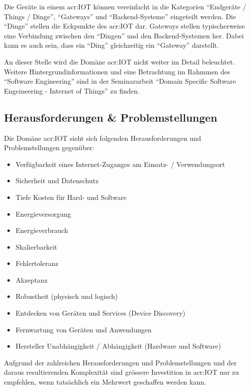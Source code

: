 Die Geräte in einem \gls{acr:IOT} können vereinfacht in die Kategorien "`Endgeräte / Things / Dinge"', "`Gateways"' und "`Backend-Systeme"' eingeteilt werden. Die "`Dinge"' stellen die Eckpunkte des \gls{acr:IOT} dar. Gateways stellen typischerweise eine Verbindung zwischen den "`Dingen"' und den Backend-Systemen her. Dabei kann es auch sein, dass ein "`Ding"' gleichzeitig  ein "`Gateway"' darstellt.

An dieser Stelle wird die Domäne \gls{acr:IOT} nicht weiter im Detail beleuchtet. Weitere Hintergrundinformationen und eine Betrachtung im Rahmmen des "`Software Engineering"' sind in der Seminararbeit "`Domain Specific Software Engeineering - Internet of Things"' \cite{E:DBRU:SEM:IOT} zu finden.

\subsection{Herausforderungen \& Problemstellungen}\label{sec:AnalyseIot:ChallangesAndProblems}
Die Domäne \gls{acr:IOT} sieht sich folgenden Herausforderungen und Problemstellungen gegenüber:

\begin{itemize}
\item Verfügbarkeit eines Internet-Zuganges am Einsatz- / Verwendungsort
\item Sicherheit und Datenschutz
\item Tiefe Kosten für Hard- und Software
\item Energieversorgung
\item Energieverbrauch
\item Skalierbarkeit
\item Fehlertoleranz
\item Akzeptanz
\item Robustheit (physisch und logisch)
\item Entdecken von Geräten und Services (Device Discovery)
\item Fernwartung von Geräten und Anwendungen
\item Hersteller Unabhängigkeit / Abhängigkeit (Hardware und Software)
\end{itemize}

Aufgrund der zahlreichen Herausforderungen und Problemstellungen und der daraus resultierenden Komplexität sind grössere Investition in \gls{acr:IOT} nur zu empfehlen, wenn tatsächlich ein Mehrwert geschaffen werden kann.
\newpage


